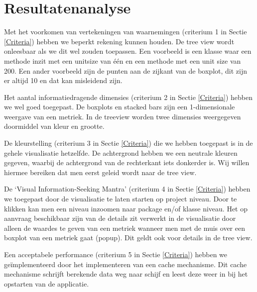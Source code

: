 \documentclass[a4paper]{article}
\begin{document}
\section{Resultatenanalyse}
Met het voorkomen van vertekeningen van waarnemingen (criterium 1 in Sectie \ref{Criteria}) hebben we beperkt rekening kunnen houden. De tree view wordt onleesbaar als we dit wel zouden toepassen. Een voorbeeld is een klasse waar een methode inzit met een unitsize van één en een methode met een unit size van 200.
Een ander voorbeeld zijn de punten aan de zijkant van de boxplot, dit zijn er altijd 10 en dat kan misleidend zijn.

Het aantal informatiedragende dimensies (criterium 2 in Sectie \ref{Criteria}) hebben we wel goed toegepast. De boxplots en stacked bars zijn een 1-dimensionale weergave van een metriek. In de treeview worden twee dimensies weergegeven doormiddel van kleur en grootte. 

De kleurstelling (criterium 3 in Sectie \ref{Criteria}) die we hebben toegepast is in de gehele visualisatie hetzelfde.  De achtergrond hebben we een neutrale kleuren gegeven, waarbij de achtergrond van de rechterkant iets donkerder is. Wij willen hiermee bereiken dat men eerst geleid wordt naar de tree view.

De `Visual Information-Seeking Mantra' (criterium 4 in Sectie \ref{Criteria}) hebben we toegepast door de visualisatie te laten starten op project niveau. Door te klikken kan men een niveau inzoomen naar package en/of klasse niveau. Het op aanvraag beschikbaar zijn van de details zit verwerkt in de visualisatie door alleen de waardes te geven van een metriek wanneer men met de muis over een boxplot van een metriek gaat (popup). Dit geldt ook voor details in de tree view.

Een acceptabele performance (criterium 5 in Sectie \ref{Criteria}) hebben we geïmplementeerd door het implementeren van een cache mechanisme. Dit cache mechanisme \mbox{schrijft} berekende data weg naar schijf en leest deze weer in bij het opstarten van de applicatie.



\end{document}
